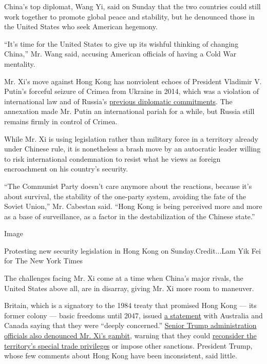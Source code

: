 China's top diplomat, Wang Yi, said on Sunday that the two countries
could still work together to promote global peace and stability, but he
denounced those in the United States who seek American hegemony.

``It's time for the United States to give up its wishful thinking of
changing China,'' Mr. Wang said, accusing American officials of having a
Cold War mentality.

Mr. Xi's move against Hong Kong has nonviolent echoes of President
Vladimir V. Putin's forceful seizure of Crimea from Ukraine in 2014,
which was a violation of international law and of Russia's
\href{https://www.nytimes.com/2015/02/21/world/europe/britain-europe-ukraine-house-of-lords-report.html}{previous
diplomatic commitments}. The annexation made Mr. Putin an international
pariah for a while, but Russia still remains firmly in control of
Crimea.

While Mr. Xi is using legislation rather than military force in a
territory already under Chinese rule, it is nonetheless a brash move by
an autocratic leader willing to risk international condemnation to
resist what he views as foreign encroachment on his country's security.

``The Communist Party doesn't care anymore about the reactions, because
it's about survival, the stability of the one-party system, avoiding the
fate of the Soviet Union,'' Mr. Cabestan said. ``Hong Kong is being
perceived more and more as a base of surveillance, as a factor in the
destabilization of the Chinese state.''

Image

Protesting new security legislation in Hong Kong on Sunday.Credit...Lam
Yik Fei for The New York Times

The challenges facing Mr. Xi come at a time when China's major rivals,
the United States above all, are in disarray, giving Mr. Xi more room to
maneuver.

Britain, which is a signatory to the 1984 treaty that promised Hong Kong
--- its former colony --- basic freedoms until 2047, issued
\href{https://www.gov.uk/government/news/joint-statement-from-the-uk-australia-and-canada-on-hong-kong}{a
statement} with Australia and Canada saying that they were ``deeply
concerned.''
\href{https://www.nytimes.com/2020/05/22/world/asia/trump-pompeo-china-hong-kong.html}{Senior
Trump administration officials also denounced Mr. Xi's gambit}, warning
that they could
\href{https://www.nytimes.com/2020/05/28/business/hong-kong-special-status-explained.html}{reconsider
the territory's special trade privileges} or impose other sanctions.
President Trump, whose few comments about Hong Kong have been
inconsistent, said little.

